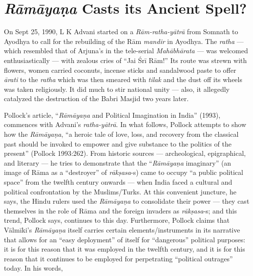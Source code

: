 \chapter{{\sl\bfseries Rāmāyaṇa} Casts its Ancient Spell?}\label{chapter3} 


On Sept 25, 1990, L K Advani started on a {\sl Rām-ratha-yātrā} from Somnath to Ayodhya to call for the rebuilding of the Rām {\sl mandir} in Ayodhya. The {\sl ratha} — which resembled that of Arjuna’s in the tele-serial {\sl Mahābhārata} — was welcomed enthusiastically — with zealous cries of “Jai Śrī Rām!” Its route was strewn with flowers, women carried coconuts, incense sticks and sandalwood paste to offer {\sl ārati} to the {\sl ratha} which was then smeared with {\sl tilak} and the dust off its wheels was taken religiously. It did much to stir national unity — also, it allegedly catalyzed the destruction of the Babri Masjid two years later.   

Pollock’s article, “{\sl Rāmāyaṇa} and Political Imagination in India” (1993), commences with Advani’s {\sl ratha-yātrā}. In what follows, Pollock attempts to show how the {\sl Rāmāyaṇa}, “a heroic tale of love, loss, and recovery from the classical past should be invoked to empower and give substance to the politics of the present” (Pollock 1993:262). From historic sources — archeological, epigraphical, and literary — he tries to demonstrate that the “{\sl Rāmāyaṇa} imaginary” (an image of Rāma as a “destroyer” of {\sl rākṣasa}-s) came to occupy “a public political space” from the twelfth century onwards — when India faced a cultural and political confrontation by the Muslims/Turks. At this convenient juncture, he says, the Hindu rulers used the {\sl Rāmāyaṇa} to consolidate their power — they cast themselves in the role of Rāma and the foreign invaders as {\sl rākṣasa}-s; and this trend, Pollock says, continues to this day. Furthermore, Pollock claims that Vālmīki’s {\sl Rāmāyaṇa} itself carries certain elements/instruments in its narrative that allows for an “easy deployment” of itself for “dangerous” political purposes: it is for this reason that it was employed in the twelfth century, and it is for this reason that it continues to be employed for perpetrating “political outrages” today. In his words,   

